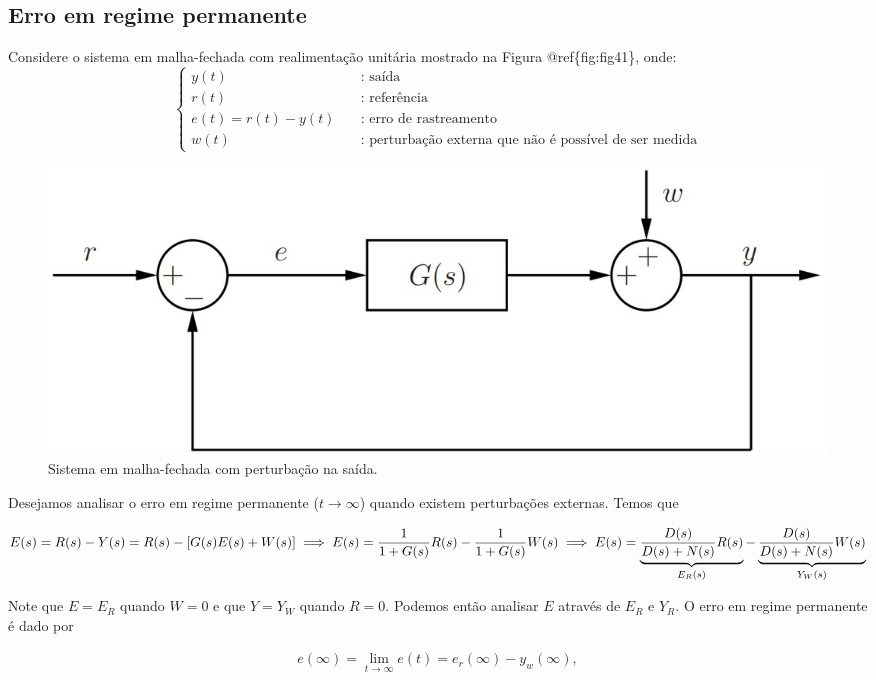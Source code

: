 \documentclass[
]{book}
\begin{document}
\hypertarget{erro-em-regime-permanente}{%
\subsection*{Erro em regime permanente}\label{erro-em-regime-permanente}}

Considere o sistema em malha-fechada com realimentação unitária mostrado na Figura @ref\{fig:fig41\}, onde:
\[
\begin{cases}
  y(t) & \quad \text{: saída}\\
  r(t) & \quad \text{: referência}\\
  e(t) = r(t)-y(t) & \quad \text{: erro de rastreamento}\\
  w(t) &\quad \text{: perturbação externa que não é possível de ser medida}
\end{cases}
\]

\begin{figure}
\includegraphics[width=0.8\linewidth]{Imagens/Lab4/Apresentação/fig1} \caption{Sistema em malha-fechada com perturbação na saída.}\label{fig:fig41}
\end{figure}

Desejamos analisar o erro em regime permanente (\(t \to \infty\)) quando existem perturbações externas. Temos que

\[
E(s) = R(s) - Y(s) = R(s) - [G(s)E(s) + W(s)]\\
\implies E(s) = \frac {1}{1 + G(s)}R(s) - \frac {1}{1+G(s)}W(s) \\
\implies E(s) = \underbrace{\frac {D(s)}{D(s) + N(s)}R(s)}_{E_R(s)} - \underbrace{\frac {D(s)}{D(s) + N(s)}W(s)}_{Y_W(s)}
\]

Note que \(E = E_R\) quando \(W= 0\) e que \(Y = Y_W\) quando \(R=0\). Podemos então analisar \(E\) através de \(E_R\) e \(Y_R\). O erro em regime permanente é dado por

\begin{align}
e(\infty) = \lim\limits_{t \to \infty}{e(t)} = e_r(\infty) - y_w(\infty), \label{eq:eq41}
\end{align}
\end{document}
